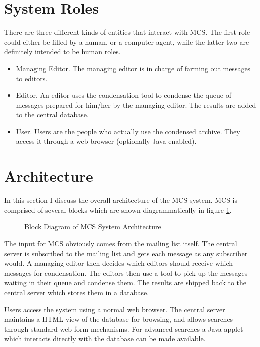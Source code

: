 \section{System Roles}
There are three different kinds of entities that interact with MCS. The first
role could either be filled by a human, or a computer agent, while the latter
two are definitely intended to be human roles.

\begin{itemize}
\item Managing Editor. The managing editor is in charge of farming out messages
  to editors.
\item Editor. An editor uses the condensation tool to condense the queue of
  messages prepared for him/her by the managing editor. The results are added
  to the central database.
\item User. Users are the people who actually use the condensed archive. They
  access it through a web browser (optionally Java-enabled).
\end{itemize}

\section{Architecture}
In this section I discuss the overall architecture of the MCS system. MCS is
comprised of several blocks which are shown diagrammatically in figure
\ref{fig:mcs-architecture}.

\begin{figure}[htbp]
  {\centerline {}}
  \caption{Block Diagram of MCS System Architecture}
  \label{fig:mcs-architecture}
\end{figure}

The input for MCS obviously comes from the mailing list itself. The central
server is subscribed to the mailing list and gets each message as any
subscriber would. A managing editor then decides which editors should receive
which messages for condensation. The editors then use a tool to pick up the
messages waiting in their queue and condense them. The results are shipped back
to the central server which stores them in a database.

Users access the system using a normal web browser. The central server
maintains a HTML view of the database for browsing, and allows searches through
standard web form mechanisms. For advanced searches a Java applet which
interacts directly with the database can be made available.

